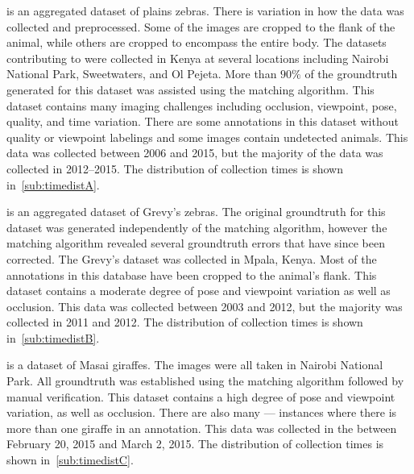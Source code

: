         \begin{itemln}
            \item \textbf{\pzmasterI{}} is an aggregated dataset of
              plains zebras.
            There is variation in how the data was collected and
              preprocessed.
            Some of the images are cropped to the flank of the animal,
              while others are cropped to encompass the entire body.
            The datasets contributing to \pzmasterI{} were collected in
              Kenya at several locations including Nairobi National Park,
              Sweetwaters, and Ol Pejeta.
            More than $90\percent$ of the groundtruth generated for
              this dataset was assisted using the matching algorithm.
            This dataset contains many imaging challenges including
              occlusion, viewpoint, pose, quality, and time variation.
            There are some annotations in this dataset without quality
              or viewpoint labelings and some images contain undetected
              animals.
            This data was collected between 2006 and 2015, but the
              majority of the data was collected in 2012--2015.
            The distribution of collection times is shown
              in~\cref{sub:timedistA}.

            \item \textbf{\gzall{}} is an aggregated dataset of Grevy's
              zebras.
            The original groundtruth for this dataset was generated
              independently of the matching algorithm, however the
              matching algorithm revealed several groundtruth errors that
              have since been corrected.
            The Grevy's dataset was collected in Mpala, Kenya.
            Most of the annotations in this database have been cropped
              to the animal's flank.
            This dataset contains a moderate degree of pose and
              viewpoint variation as well as occlusion.
            This data was collected between 2003 and 2012, but the
              majority was collected in 2011 and 2012.
            The distribution of collection times is shown
              in~\cref{sub:timedistB}.

            \item \textbf{\girmmasterI{}} is a dataset of Masai giraffes.
            The images were all taken in Nairobi National Park.
            All groundtruth was established using the matching
              algorithm followed by manual verification.
            This dataset contains a high degree of pose and viewpoint
              variation, as well as occlusion.
            There are also many  --- instances
              where there is more than one giraffe in an annotation.
            This data was collected in the \GZC{} between February 20,
              2015 and March 2, 2015.
            The distribution of collection times is shown
              in~\cref{sub:timedistC}.
        \end{itemln}

